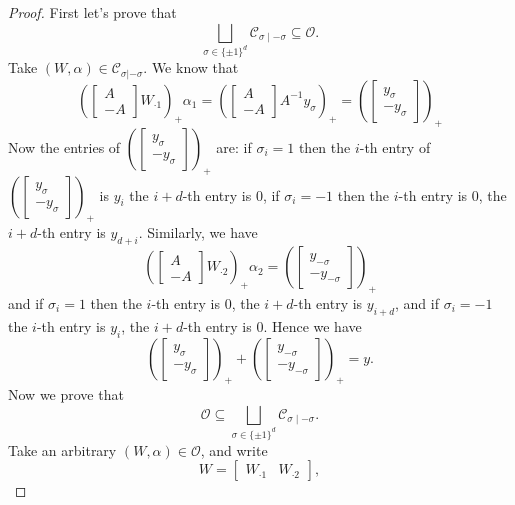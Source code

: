 \documentclass{article}
\begin{document}
\begin{proof}
First let's prove that 
\[
\bigsqcup_{\sigma \in \{\pm 1\}^{d}}
\mathcal{C}_{\sigma \mid -\sigma} \subseteq \mathcal{O}.
\]
Take $(W, \alpha) \in \mathcal{C}_{\sigma | -\sigma}$. We know that
\[
(\begin{bmatrix}
    A \\ -A
\end{bmatrix} W_{\cdot 1})_{+}\alpha_1 = (\begin{bmatrix}
    A \\ -A
\end{bmatrix} A^{-1} y_{\sigma})_{+} = (\begin{bmatrix}
    y_{\sigma} \\ -y_\sigma
\end{bmatrix})_{+}
\]
Now the entries of $(\begin{bmatrix}
    y_{\sigma} \\ -y_\sigma
\end{bmatrix})_{+}$ are:
if $\sigma_i = 1$ then the $i$-th entry of $(\begin{bmatrix}
    y_{\sigma} \\ -y_\sigma
\end{bmatrix})_{+}$ is $y_i$ the $i+d$-th entry is 0, if $\sigma_i = -1$ then the $i$-th entry is 0, the $i+d$-th entry is $y_{d+i}$.
Similarly, we have 
\[
(\begin{bmatrix}
    A \\ -A
\end{bmatrix} W_{\cdot 2})_{+}\alpha_2 = (\begin{bmatrix}
    y_{-\sigma} \\ -y_{-\sigma}
\end{bmatrix})_{+}
\]
and if $\sigma_i = 1$ then the $i$-th entry is 0, the $i+d$-th entry is $y_{i+d}$, and if $\sigma_i = -1$ the $i$-th entry is $y_i$, the $i+d$-th entry is 0. Hence we have
\[
(\begin{bmatrix}
    y_{\sigma} \\ -y_{\sigma}
\end{bmatrix})_{+}+(\begin{bmatrix}
    y_{-\sigma} \\ -y_{-\sigma}
\end{bmatrix})_{+} = y.
\]
Now we prove that 
\[
\mathcal{O} \subseteq \bigsqcup_{\sigma \in \{\pm 1\}^{d}}
\mathcal{C}_{\sigma \mid -\sigma}.
\]
Take an arbitrary $(W,\alpha)\in\mathcal O$, and write
\[
W=\begin{bmatrix}W_{\cdot 1} & W_{\cdot 2}\end{bmatrix},
\]
\end{proof}
\end{document}
